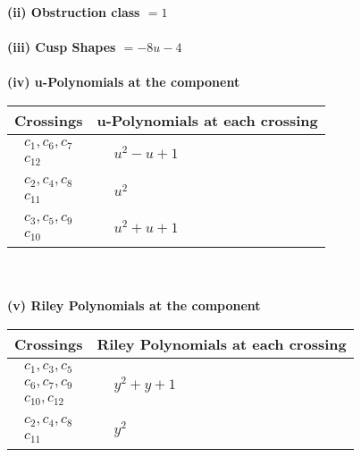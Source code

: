 \documentclass[1p]{elsarticle_modified}
\theoremstyle{definition}
\begin{document}
\flushleft \textbf{(ii) Obstruction class $= 1$}\\~\\
\flushleft \textbf{(iii) Cusp Shapes $= -8 u-4$}\\~\\
\newpage\renewcommand{\arraystretch}{1}
\flushleft \textbf{(iv) u-Polynomials at the component}\newline \\
\begin{tabular}{m{50pt}|m{274pt}}
Crossings & \hspace{64pt}u-Polynomials at each crossing \\
\hline $$\begin{aligned}c_{1},c_{6},c_{7}\\c_{12}\end{aligned}$$&$\begin{aligned}
&u^2- u+1
\end{aligned}$\\
\hline $$\begin{aligned}c_{2},c_{4},c_{8}\\c_{11}\end{aligned}$$&$\begin{aligned}
&u^2
\end{aligned}$\\
\hline $$\begin{aligned}c_{3},c_{5},c_{9}\\c_{10}\end{aligned}$$&$\begin{aligned}
&u^2+u+1
\end{aligned}$\\
\hline
\end{tabular}\\~\\
\newpage\renewcommand{\arraystretch}{1}
\flushleft \textbf{(v) Riley Polynomials at the component}\newline \\
\begin{tabular}{m{50pt}|m{274pt}}
Crossings & \hspace{64pt}Riley Polynomials at each crossing \\
\hline $$\begin{aligned}c_{1},c_{3},c_{5}\\c_{6},c_{7},c_{9}\\c_{10},c_{12}\end{aligned}$$&$\begin{aligned}
&y^2+y+1
\end{aligned}$\\
\hline $$\begin{aligned}c_{2},c_{4},c_{8}\\c_{11}\end{aligned}$$&$\begin{aligned}
&y^2
\end{aligned}$\\
\hline
\end{tabular}\\~\\
\end{document}
